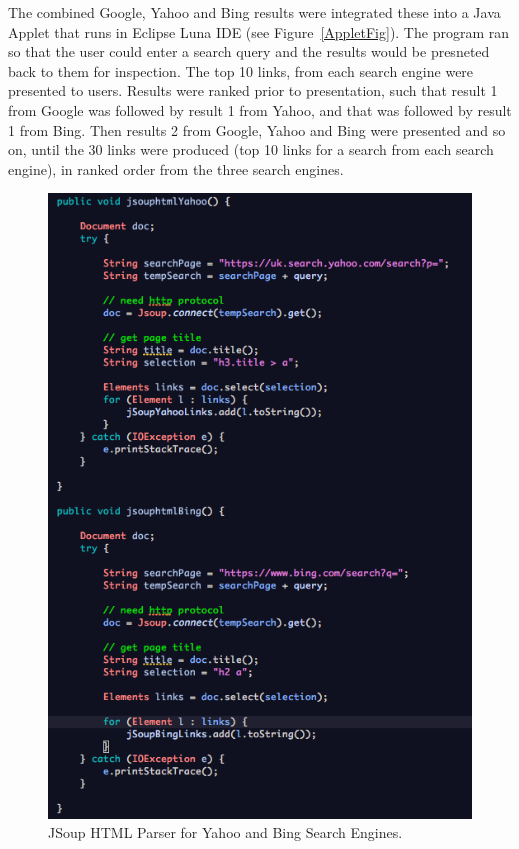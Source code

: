\documentclass[a4paper, 11pt]{article}
\begin{document}
\vspace{5mm}
The combined Google, Yahoo and Bing results were integrated these into a Java Applet that runs in Eclipse Luna IDE (see Figure~\ref{AppletFig}). The program ran so that the user could enter a search query and the results would be presneted back to them for inspection. The top 10 links, from each search engine were presented to users. Results were ranked prior to presentation, such that result 1 from Google was followed by result 1 from Yahoo, and that was followed by result 1 from Bing. Then results 2 from Google, Yahoo and Bing were presented and so on, until the 30 links were produced (top 10 links for a search from each search engine), in ranked order from the three search engines. 

\begin{figure}[H]
\begin{center}
\includegraphics[scale=0.60]{htmlParsers}
\end{center}
\caption{JSoup HTML Parser for Yahoo and Bing Search Engines.}
\label{GoogleSignInPage}
\end{figure}
\end{document}
